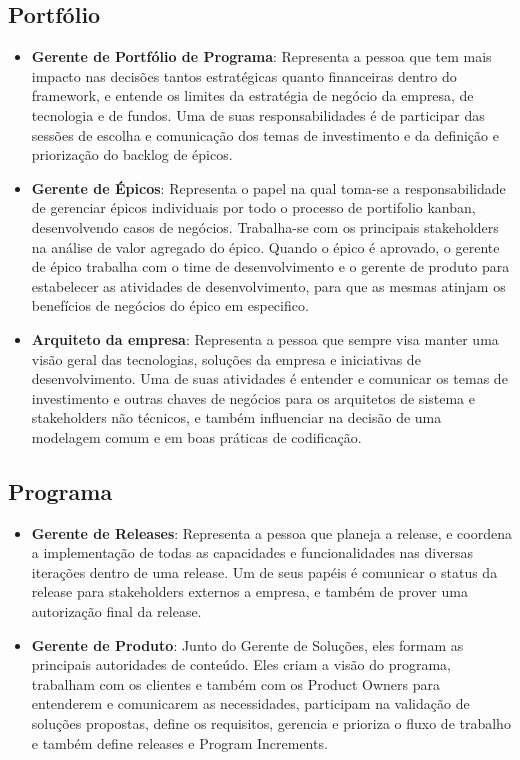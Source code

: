 \subsection{\textbf{Portfólio}}

  \begin{itemize}
    \item \textbf{Gerente de Portfólio de Programa}: Representa a pessoa que tem mais impacto nas decisões tantos estratégicas quanto
      financeiras dentro do framework, e entende os limites da estratégia de negócio da empresa, de tecnologia e de fundos. Uma de suas
      responsabilidades é de participar das sessões de escolha e comunicação dos temas de investimento e da definição e priorização do
      backlog de épicos.
    \item \textbf{Gerente de Épicos}: Representa o papel na qual toma-se a responsabilidade de gerenciar épicos individuais por todo o
      processo de portifolio kanban, desenvolvendo casos de negócios. Trabalha-se com os principais stakeholders na análise de valor
      agregado do épico. Quando o épico é aprovado, o gerente de épico trabalha com o time de desenvolvimento e o gerente de produto
      para estabelecer as atividades de desenvolvimento, para que as mesmas atinjam os benefícios de negócios do épico em especifico.
    \item \textbf{Arquiteto da empresa}: Representa a pessoa que sempre visa manter uma visão geral das tecnologias, soluções da
      empresa e iniciativas de desenvolvimento. Uma de suas atividades é entender e comunicar os temas de investimento e outras chaves
      de negócios para os arquitetos de sistema e stakeholders não técnicos, e também influenciar na decisão de uma modelagem comum e
      em boas práticas de codificação.
  \end{itemize}

\subsection{\textbf{Programa}}

  \begin{itemize}
    \item \textbf{Gerente de Releases}: Representa a pessoa que planeja a release, e coordena a implementação de todas as capacidades e
      funcionalidades nas diversas iterações dentro de uma release. Um de seus papéis é comunicar o status da release para stakeholders
      externos a empresa, e também de prover uma autorização final da release.
    \item \textbf{Gerente de Produto}: Junto do Gerente de Soluções, eles formam as principais autoridades de conteúdo. Eles criam a
      visão do programa, trabalham com os clientes e também com os Product Owners para entenderem e comunicarem as necessidades,
      participam na validação de soluções propostas, define os requisitos, gerencia e prioriza o fluxo de trabalho e também define
      releases e Program Increments.
  \end{itemize}

